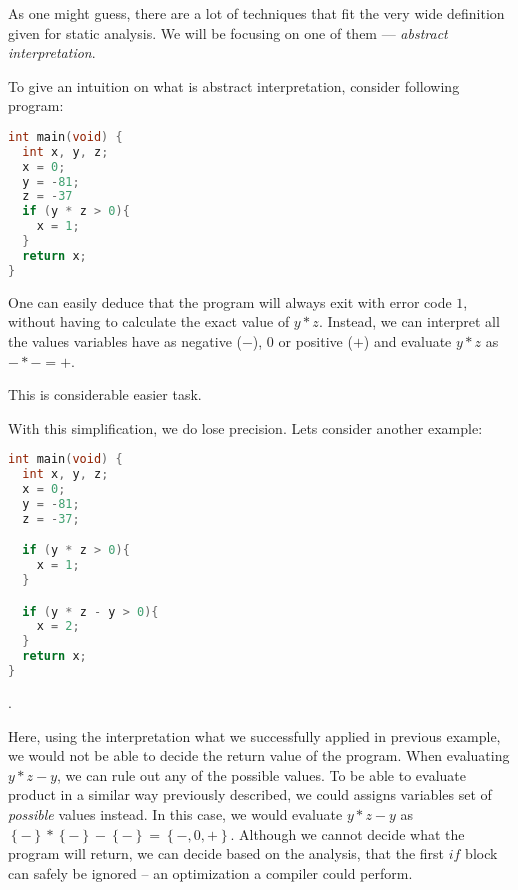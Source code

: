 \documentclass[..thesis.tex]{subfiles}
\begin{document}


As one might guess, there are a lot of techniques that fit the very wide definition given for static analysis. We will be focusing on one of them --- \textit{abstract interpretation}.



To give an intuition on what is abstract interpretation, consider following program:

\begin{lstlisting}[language=C,style=def]
int main(void) {
  int x, y, z;
  x = 0;
  y = -81;
  z = -37
  if (y * z > 0){
    x = 1;
  }
  return x;
}
\end{lstlisting}

One can easily deduce that the program will always exit with error code $1$, without having to calculate the exact value of  $y*z$.
Instead, we can interpret all the values variables have as negative ($-$), $0$ or positive ($+$) and evaluate $y * z$ as $-*- = +$.

This is considerable easier task.

With this simplification, we do lose precision. Lets consider another example:

\begin{lstlisting}[language=C,style=def]
int main(void) {
  int x, y, z;
  x = 0;
  y = -81;
  z = -37;

  if (y * z > 0){
    x = 1;
  }

  if (y * z - y > 0){
    x = 2;
  }
  return x;
}
\end{lstlisting}.


Here, using the interpretation what we successfully applied in previous example, we would not be able to decide the return value of the program. 
When evaluating $y * z - y $, we can rule out any of the possible values. To be able to evaluate product in a similar way previously described,
we could assigns variables set of \textit{possible} values instead. In this case, we would evaluate $y * z - y $ as $\left\lbrace - \right\rbrace * \left\lbrace
- \right\rbrace - \left\lbrace - \right\rbrace = \left\lbrace -,0,+ \right\rbrace$. Although we cannot decide what the program will return,
we can decide based on the analysis, that the first $if$ block can safely be ignored -- an optimization a compiler could perform.
\end{document}
